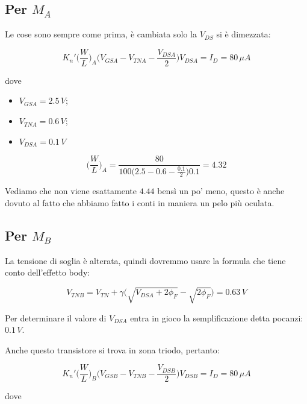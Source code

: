\subsection{Per $M_A$}

Le cose sono sempre come prima, è cambiata solo la $V_{DS}$ si è dimezzata:

\begin{equation*}
    K_n'\biggl(\frac{W}{L}\biggl)_A\biggl(V_{GSA} - V_{TNA} -\frac{V_{DSA}}{2}\biggl)V_{DSA} = I_D = 80\, \mu A
\end{equation*}

dove

\begin{itemize}
    \item $V_{GSA} = 2.5\,V$;
    \item $V_{TNA} =0.6\,V $;
    \item $V_{DSA} = 0.1\,V$
\end{itemize}

\begin{equation*}
    \biggl(\frac{W}{L}\biggl)_A = \frac{80}{100\big(2.5 - 0.6 - \frac{0.1}{2}\big)0.1} = 4.32
\end{equation*}

Vediamo che non viene esattamente $4.44$ bensì un po' meno, questo è anche dovuto al fatto che abbiamo fatto i conti in maniera un pelo più oculata.


\subsection{Per $M_B$}

La tensione di soglia è alterata, quindi dovremmo usare la formula che tiene conto dell'effetto body:

\begin{equation*}
    V_{TNB} = V_{TN} + \gamma \big(\sqrt{V_{DSA} + 2\phi_F} - \sqrt{2\phi_F}\big) = 0.63\,V
\end{equation*}

Per determinare il  valore di $V_{DSA}$ entra in gioco la semplificazione detta pocanzi: $0.1\,V$. 

Anche questo transistore si trova in zona triodo, pertanto:

\begin{equation*}
    K_n'\biggl(\frac{W}{L}\biggl)_B\biggl(V_{GSB} - V_{TNB} -\frac{V_{DSB}}{2}\biggl)V_{DSB} = I_D = 80\, \mu A
\end{equation*}

dove

